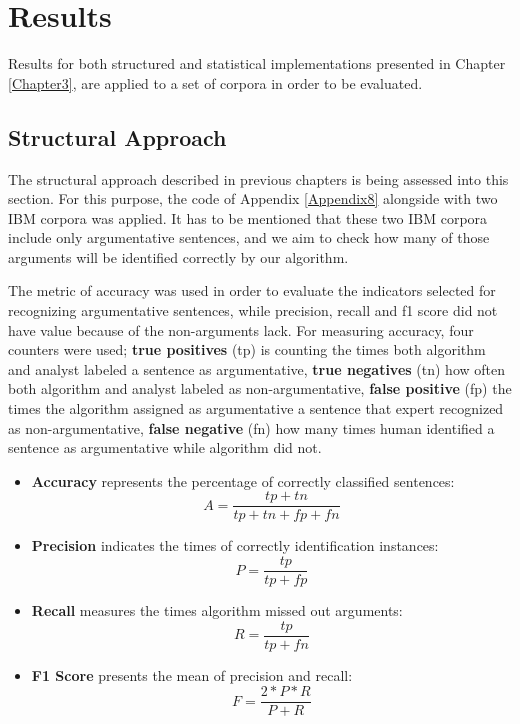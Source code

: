 \chapter{Results}

\label{Chapter5}

Results for both structured and statistical implementations presented in Chapter \ref{Chapter3}, are applied to a set of corpora in order to be evaluated. \par

\section{Structural Approach}

The structural approach described in previous chapters is being assessed into this section. For this purpose, the code of Appendix \ref{Appendix8} alongside with two IBM corpora was applied. It has to be mentioned that these two IBM corpora include only argumentative sentences, and we aim to check how many of those arguments will be identified correctly by our algorithm. 

The metric of accuracy was used in order to evaluate the indicators selected for recognizing argumentative sentences, while precision, recall and f1 score did not have value because of the non-arguments lack. For measuring accuracy, four counters were used; \textbf{true positives} (tp) is counting the times both algorithm and analyst labeled a sentence as argumentative, \textbf{true negatives} (tn) how often both algorithm and analyst labeled as non-argumentative, \textbf{false positive} (fp) the times the algorithm assigned as argumentative a sentence that expert recognized as non-argumentative, \textbf{false negative} (fn) how many times human identified a sentence as argumentative while algorithm did not. 

\begin{itemize}
 	\item \textbf{Accuracy} represents the percentage of correctly classified sentences:
 	\[ A
 	= \dfrac{tp + tn}{tp + tn + fp + fn}
 	\]
 	\item \textbf{Precision} indicates the times of correctly identification instances:
 	\[ P
 	= \dfrac{tp}{tp + fp}
 	\]
 	\item \textbf{Recall} measures the times algorithm missed out arguments:
 	\[ R
 	= \dfrac{tp}{tp + fn}
 	\]
 	\item \textbf{F1 Score} presents the mean of precision and recall:
 	\[ F
 	= \dfrac{2*P*R}{P + R}
 	\]
\end{itemize} 

